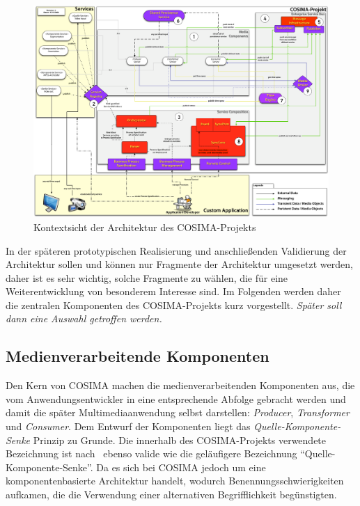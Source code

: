 \begin{figure}[ht]
  \centering
    \includegraphics[width=.9\textwidth]{images/Kontextsicht_Architektur_COSIMA}
  \caption{Kontextsicht der Architektur des COSIMA-Projekts}
  \label{fig:Kontextsicht_Architektur_COSIMA}
\end{figure}

  In der späteren prototypischen Realisierung und anschließenden Validierung der Architektur sollen und können nur Fragmente der Architektur umgesetzt werden, daher ist es sehr wichtig, solche Fragmente zu wählen, die für eine Weiterentwicklung von besonderem Interesse sind. Im Folgenden werden daher die zentralen Komponenten des COSIMA-Projekts kurz vorgestellt. \emph{Später soll dann eine Auswahl getroffen werden.}



\subsection{Medienverarbeitende Komponenten} %
\label{sub:medienverarbeitende_komponenten}

  Den Kern von COSIMA machen die medienverarbeitenden Komponenten aus, die vom Anwendungsentwickler in eine entsprechende Abfolge gebracht werden und damit die später Multimediaanwendung selbst darstellen: \emph{Producer}, \emph{Transformer} und \emph{Consumer}. Dem Entwurf der Komponenten liegt das \emph{Quelle-Komponente-Senke} Prinzip zu Grunde. Die innerhalb des COSIMA-Projekts verwendete Bezeichnung ist nach~\citep{a_multimedia_component_kit,multimedia_component_frameworks} ebenso valide wie die geläufigere Bezeichnung "`Quelle-Komponente-Senke"'. Da es sich bei COSIMA jedoch um eine komponentenbasierte Architektur handelt, wodurch Benennungsschwierigkeiten aufkamen, die die Verwendung einer alternativen Begrifflichkeit begünstigten.
  
